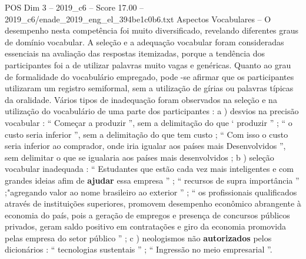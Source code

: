 \begin{textsample}{POS Dim 3 – 2019\_c6 – Score 17.00 – 2019\_c6/enade\_2019\_eng\_el\_394be1c0b6.txt}
Aspectos Vocabulares – O desempenho nesta competência foi muito diversificado, revelando diferentes graus de domínio vocabular.
A seleção e a adequação vocabular foram consideradas essenciais na avaliação das respostas itemizadas, porque a tendência dos participantes foi a de utilizar palavras muito vagas e genéricas.
Quanto ao grau de formalidade do vocabulário empregado, pode -se afirmar que os participantes utilizaram um registro semiformal, sem a utilização de gírias ou palavras típicas da oralidade.
Vários tipos de inadequação foram observados na seleção e na utilização do vocabulário de uma parte dos participantes : a ) desvios na precisão vocabular : “ Começar a produzir ”, sem a delimitação do que ‘ produzir ” ; “ o custo seria inferior ”, sem a delimitação do que tem custo ; “ Com isso o custo seria inferior ao comprador, onde iria igualar aos países mais Desenvolvidos ”, sem delimitar o que se igualaria aos países mais desenvolvidos ; b ) seleção vocabular inadequada : “ Estudantes que estão cada vez mais inteligentes e com grandes ideias afim de \textbf{ajudar} essa empresa ” ; “ recursos de supra importância ” ;"agregando valor ao nome brasileiro ao exterior ” ; “ os profissionais qualificados através de instituições superiores, promovem desempenho econômico abrangente à economia do país, pois a geração de empregos e presença de concursos públicos privados, geram saldo positivo em contratações e giro da economia promovida pelas empresa do setor público ” ; c ) neologismos não \textbf{autorizados} pelos dicionários : “ tecnologias sustentais ” ; “ Ingressão no meio empresarial ”.

\end{textsample}
